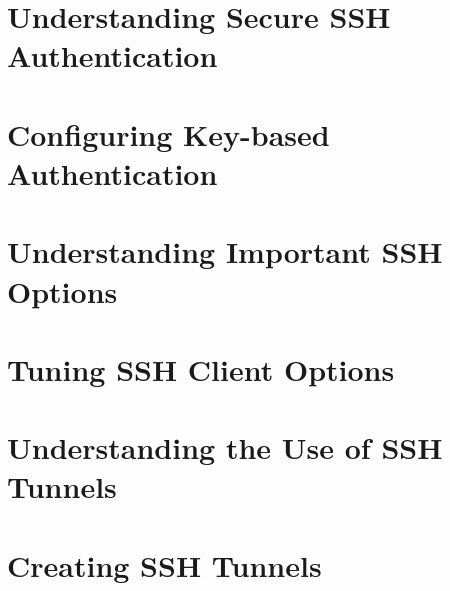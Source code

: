 
\usepackage{minted}
\usepackage{booktabs}


		
	
	\section{Understanding Secure SSH Authentication}
	
	
	\section{Configuring Key-based Authentication}
	\section{Understanding Important SSH Options}
	\section{Tuning SSH Client Options}
	\section{Understanding the Use of SSH Tunnels}
	\section{Creating SSH Tunnels}


